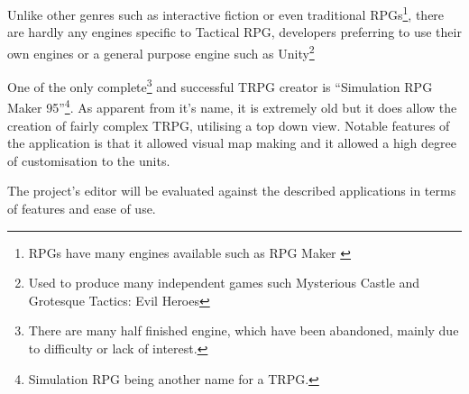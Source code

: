Unlike other genres such as interactive fiction\cite{Bogdan2010Interactive-Fic} or even traditional RPGs\footnote{RPGs have many engines available such as RPG Maker \cite{rpgmaker}}, there are hardly any engines specific to Tactical RPG, developers preferring to use their own engines or a general purpose engine such as Unity\footnote{Used to produce many independent games such Mysterious Castle and Grotesque Tactics: Evil Heroes}

One of the only complete\footnote{There are many half finished engine, which have been abandoned, mainly due to difficulty or lack of interest.} and successful TRPG creator is ``Simulation RPG Maker 95''\footnote{Simulation RPG being another name for a TRPG.}.  As apparent from it's name, it is extremely old but it does allow the creation of fairly complex TRPG, utilising a top down view. Notable features of the application is that it allowed visual map making and it allowed a high degree of customisation to the units. 

The project's editor will be evaluated against the described applications in terms of features and ease of use. 

